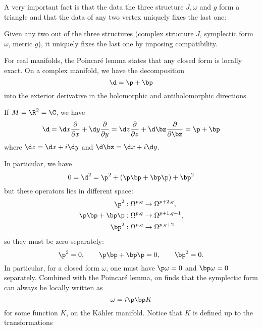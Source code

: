 \documentclass{worksheetclass}
\begin{document}
        A very important fact is that the data the three structure $J,\omega$ and $g$ form a triangle and that the data of any two vertex uniquely fixes the last one:
        \begin{prop}
            Given any two out of the three structures (complex structure $J$, symplectic form $\omega$, metric $g$), it uniquely fixes the last one by imposing compatibility.
        \end{prop}
        
        For real manifolds, the Poincaré lemma states that any closed form is locally exact. On a complex manifold, we have the decomposition
        \begin{equation}
            \d= \p + \bp
        \end{equation}
        into the exterior derivative in the holomorphic and antiholomorphic directions.
        \begin{examp}
            If $M=\R^2=\C$, we have
            \begin{equation}
                \d=\d x \pdv{}{x}+\d y \pdv{}{y} = \d z\pdv{}{z}+\d\bz\pdv{}{\bz}=\p+\bp
            \end{equation}
            where $\d z=\d x+i\d y$ and $\d\bz =\d x+i\d y$.
        \end{examp}
        In particular, we have
        \begin{equation}
            0 = \d^2 = \p^2 + (\p\bp+\bp\p) + \bp^2
        \end{equation}
        but these operators lies in different space:
        \begin{align}
            \p^2&:\Omega^{p,q}\to\Omega^{p+2,q},\\
            \p\bp+\bp\p&:\Omega^{p,q}\to\Omega^{p+1,q+1},\\
            \bp^2&:\Omega^{p,q}\to\Omega^{p,q+2}
        \end{align}
        so they must be zero separately:
        \begin{equation}
            \p^2=0,\qquad \p\bp+\bp\p=0,\qquad \bp^2=0.
        \end{equation}
        In particular, for a closed form $\omega$, one must have $\p\omega=0$ and $\bp\omega=0$ separately. Combined with the Poincaré lemma, on finds that the symplectic form can always be locally written as
        \begin{equation}\label{eq:Kählerpot}
            \omega = i\p\bp K 
        \end{equation}
        for some function $K$, on the Kähler manifold. Notice that $K$ is defined up to the transformations
\end{document}
